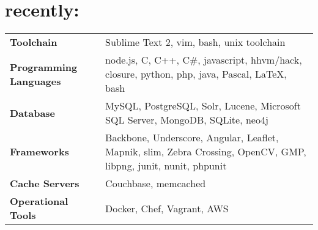 \section{ recently:}
\noindent \begin{tabular}{ l p{10.5cm} }
\textbf{Toolchain} & Sublime Text 2, vim, bash, unix toolchain\\[0.4em]
\textbf{Programming Languages} & node.js, C, C++, C\#, javascript, hhvm/hack, closure, python, php, java, Pascal, LaTeX, bash\\[0.4em]
\textbf{Database} & MySQL, PostgreSQL, Solr, Lucene, Microsoft SQL Server, MongoDB, SQLite, neo4j\\[0.4em]
\textbf{Frameworks} & Backbone, Underscore, Angular, Leaflet, Mapnik, slim, Zebra Crossing, OpenCV, GMP, libpng, junit, nunit, phpunit\\[0.4em]
\textbf{Cache Servers} & Couchbase, memcached\\[0.4em]
\textbf{Operational Tools} & Docker, Chef, Vagrant, AWS\\
\end{tabular}
\smallskip
